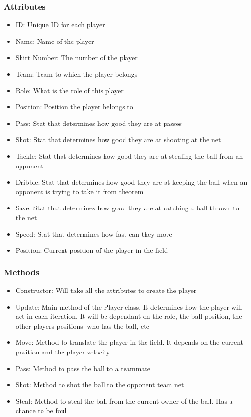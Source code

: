 \documentclass{article}
\theoremstyle{mytheoremstyle}
\theoremstyle{mytheoremstyle}
\theoremstyle{myproblemstyle}
\begin{document}
    \subsubsection{Attributes}
    \begin{itemize}
        \item ID: Unique ID for each player
        \item Name: Name of the player
        \item Shirt Number: The number of the player
        \item Team: Team to which the player belongs
        \item Role: What is the role of this player
        \item Position: Position the player belongs to
        \item Pass: Stat that determines how good they are at passes
        \item Shot: Stat that determines how good they are at shooting at the net
        \item Tackle: Stat that determines how good they are at stealing the ball from an opponent
        \item Dribble: Stat that determines how good they are at keeping the ball when an opponent is trying to take it from theorem
        \item Save: Stat that determines how good they are at catching a ball thrown to the net
        \item Speed: Stat that determines how fast can they move
        \item Position: Current position of the player in the field
    \end{itemize}

    \subsubsection{Methods}
    \begin{itemize}
        \item Constructor: Will take all the attributes to create the player
        \item Update: Main method of the Player class. It determines how the player will act in each iteration. It will be dependant on the role, the ball position, the other players positions, who has the ball, etc
        \item Move: Method to translate the player in the field. It depends on the current position and the player velocity
        \item Pass: Method to pass the ball to a teammate
        \item Shot: Method to shot the ball to the opponent team net
        \item Steal: Method to steal the ball from the current owner of the ball. Has a chance to be foul 
    \end{itemize}
\end{document}
